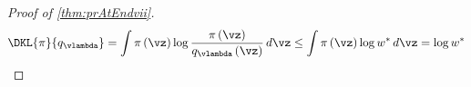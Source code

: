 \prAtEndRestatevii*
\label{proofsection:prAtEndvii}\begin{proof}[Proof of \autoref{thm:prAtEndvii}]\label{proof:prAtEndvii}\begin {align*} \DKL {\pi }{ q_{\vlambda } } = \int \pi \left (\vz \right ) \log \frac {\pi \left (\vz \right )}{q_{\vlambda }\left (\vz \right )}\,d\vz \leq \int \pi \left (\vz \right ) \log w^* \, d\vz = \log w^* \end {align*}\end{proof}
